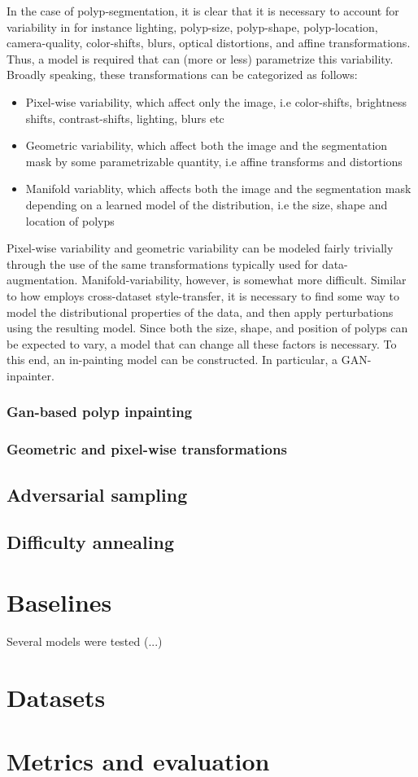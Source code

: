   		In the case of polyp-segmentation, it is clear that it is necessary to account for variability in for instance lighting, polyp-size, polyp-shape, polyp-location, camera-quality, color-shifts, blurs, optical distortions, and affine transformations. Thus, a model is required that can (more or less) parametrize this variability. Broadly speaking, these transformations can be categorized as follows:
  		\begin{itemize}
  			\item Pixel-wise variability, which affect only the image, i.e color-shifts, brightness shifts, contrast-shifts, lighting, blurs etc
  			\item Geometric variability, which affect both the image and the segmentation mask by some parametrizable quantity, i.e affine transforms and distortions
  			\item Manifold variablity, which affects both the image and the segmentation mask depending on a learned model of the distribution,  i.e the size, shape and location of polyps
  		\end{itemize}
  		Pixel-wise variability and geometric variability can be modeled fairly trivially through the use of the same transformations typically used for data-augmentation. Manifold-variability, however, is somewhat more difficult. Similar to how \cite{modelbased} employs cross-dataset style-transfer, it is necessary to find some way to model the distributional properties of the data, and then apply perturbations using the resulting model. Since both the size, shape, and position of polyps can be expected to vary, a model that can change all these factors is necessary. To this end, an in-painting model can be constructed. In particular, a GAN-inpainter.	
  		\subsubsection{Gan-based polyp inpainting}
  		\subsubsection{Geometric and pixel-wise transformations}
  	\subsection{Adversarial sampling}
  	\subsection{Difficulty annealing}
  	 			
\section{Baselines}
Several models were tested (...)
\section{Datasets}

\section{Metrics and evaluation}
